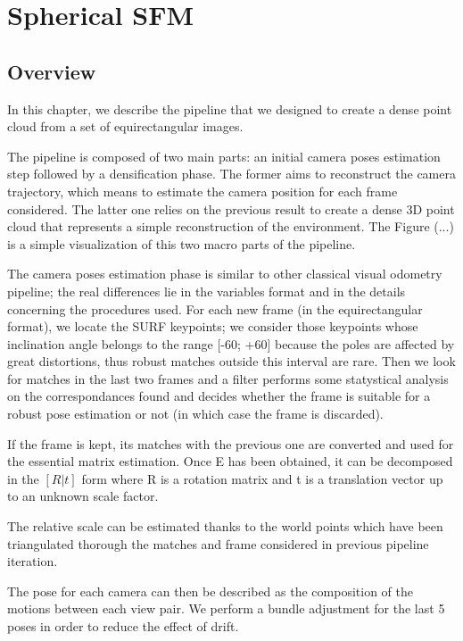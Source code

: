 \chapter{Spherical SFM}
\section{Overview}
In this chapter, we describe the pipeline that we designed to create a dense point cloud from a set of equirectangular images.

The pipeline is composed of two main parts: an initial camera poses estimation
step followed by a densification phase. The former aims to reconstruct the 
camera trajectory, which means to estimate the camera position for each frame 
considered. The latter one relies on the previous result to create a dense 
3D point cloud that represents a simple reconstruction of the environment.
The Figure (...)
is a simple visualization of this two macro parts of the 
pipeline.

The camera poses estimation phase is similar to other classical visual 
odometry pipeline; the real differences lie in the variables format and in 
the details concerning the procedures used. For each new frame 
(in the equirectangular format), we locate the
SURF keypoints; we consider those keypoints whose inclination angle belongs 
to the range [-60\degree; +60\degree] because the poles are affected by great 
distortions, thus robust matches outside this interval are rare.
Then we look for matches in the last two frames and a filter performs some 
statystical analysis on the correspondances found and decides whether the frame 
is suitable for a robust pose estimation or not (in which case the frame is 
discarded).

If the frame is kept, its matches with the previous one are converted
and used for the essential matrix estimation. Once E has been obtained, 
it can be decomposed in the \([R|t]\) form where R is a rotation matrix 
and t is a translation vector up to an unknown scale factor.

The relative scale can be estimated thanks to the world points which have been 
triangulated thorough the matches and frame considered in previous pipeline 
iteration.

The pose for each camera can then be described as the composition of the 
motions between each view pair. We perform a bundle adjustment for the last 5 
poses in order to reduce the effect of drift.


